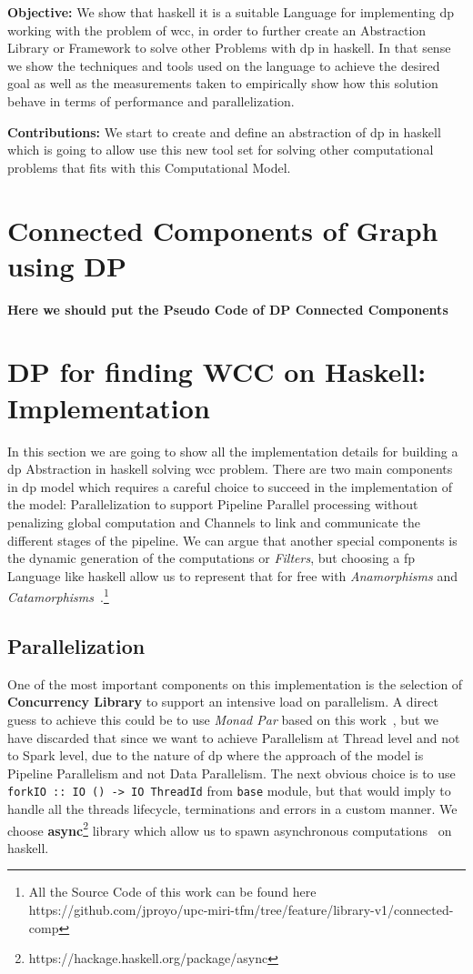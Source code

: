 \documentclass[12pt]{article}
\begin{document}
\textbf{Objective:} We show that \acrshort{haskell} it is a suitable Language for implementing \acrshort{dp} working with the problem of \acrshort{wcc}, in order to further create an Abstraction Library or Framework
to solve other Problems with \acrshort{dp} in \acrshort{haskell}.
In that sense we show the techniques and tools used on the language to achieve the desired goal as well as the measurements taken to empirically show how this solution behave in terms of performance and parallelization.

\textbf{Contributions:} We start to create and define an abstraction of \acrshort{dp} in \acrshort{haskell} which is going to allow use this new tool set for solving other computational problems that fits with this Computational Model.

\section{Connected Components of Graph using DP}
\textbf{Here we should put the Pseudo Code of DP Connected Components}

\section{DP for finding WCC on Haskell: Implementation}
In this section we are going to show all the implementation details for building a \acrshort{dp} Abstraction in \acrshort{haskell} solving \acrshort{wcc} problem.
There are two main components in \acrshort{dp} model which requires a careful choice to succeed in the implementation of the model: Parallelization to support Pipeline Parallel processing without penalizing global computation and Channels to link and communicate 
the different stages of the pipeline. We can argue that another special components is the dynamic generation of the computations or \textit{Filters}, but choosing a \acrfull{fp} Language like \acrshort{haskell} allow us to represent
that for free with \textit{Anamorphisms} and \textit{Catamorphisms}~\cite{lenses}.\footnote{All the Source Code of this work can be found here https://github.com/jproyo/upc-miri-tfm/tree/feature/library-v1/connected-comp}

\subsection{Parallelization}
One of the most important components on this implementation is the selection of \textbf{Concurrency Library} to support an intensive load on parallelism. A direct guess to achieve this
could be to use \textit{Monad Par} based on this work~\cite{monad_par}, but we have discarded that since we want to achieve Parallelism at Thread level and not to Spark level, due to the nature
of \acrshort{dp} where the approach of the model is Pipeline Parallelism and not Data Parallelism. The next obvious choice is to use \texttt{forkIO :: IO () -> IO ThreadId} from \texttt{base}
module, but that would imply to handle all the threads lifecycle, terminations and errors in a custom manner. We choose \textbf{async}\footnote{https://hackage.haskell.org/package/async} 
library which allow us to spawn asynchronous computations~\cite{parallel_book} on \acrshort{haskell}.
\end{document}

